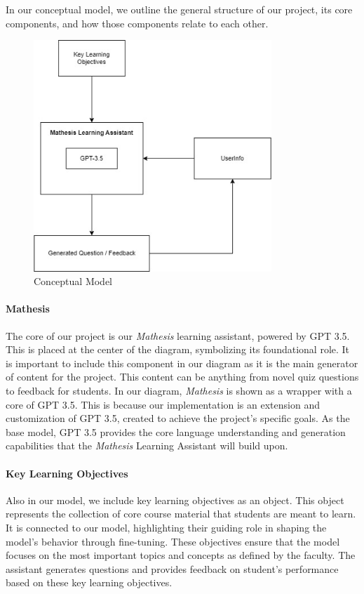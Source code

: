 \documentclass[12pt,a4paper]{article}
\begin{document}
    In our conceptual model, we outline the general structure of our project, its core components,
    and how those components relate to each other.

    \begin{figure}[h]
        \centering
        \includegraphics[width=0.8\textwidth]{Conceptual_diagram}
        \caption{Conceptual Model}
        \label{fig:conceptualModel}
    \end{figure}
    

    \paragraph{Mathesis}
    The core of our project is our \textit{Mathesis}
    learning assistant, powered by GPT 3.5.  This is placed at the center of the diagram, symbolizing
    its foundational role. It is important to include this component in our diagram as it is the main
    generator of content for the project.  This content can be anything from novel quiz questions to
    feedback for students. In our diagram, \textit{Mathesis} is shown as a wrapper with a core of
    GPT 3.5.  This is because our implementation is an extension and customization of GPT 3.5, created
    to achieve the project's specific goals. As the base model, GPT 3.5 provides the core language
    understanding and generation capabilities that the \textit{Mathesis} Learning Assistant will build
    upon.

    \paragraph{Key Learning Objectives}
    Also in our model, we include key learning objectives as an object.  This object represents the
    collection of core course material that students are meant to learn.  It is connected to our model,
    highlighting their guiding role in shaping the model's behavior through fine-tuning. These
    objectives ensure that the model focuses on the most important topics and concepts as defined by
    the faculty. The assistant generates questions and provides feedback on student's performance
    based on these key learning objectives.
\end{document}
